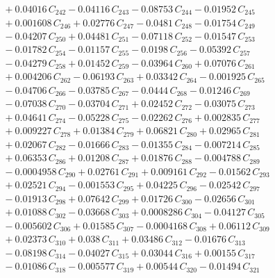 \documentclass[a4paper,11pt]{article}
\begin{document}
\begin{align}
&\quad + 0.04016\,C_{242} - 0.04116\,C_{243} - 0.08753\,C_{244} - 0.01952\,C_{245} \nonumber\\
&\quad + 0.001608\,C_{246} + 0.02776\,C_{247} - 0.0481\,C_{248} - 0.01754\,C_{249} \nonumber\\
&\quad - 0.04207\,C_{250} + 0.04481\,C_{251} - 0.07118\,C_{252} - 0.01547\,C_{253} \nonumber\\
&\quad - 0.01782\,C_{254} - 0.01157\,C_{255} - 0.0198\,C_{256} - 0.05392\,C_{257} \nonumber\\
&\quad - 0.04279\,C_{258} + 0.01452\,C_{259} - 0.03964\,C_{260} + 0.07076\,C_{261} \nonumber\\
&\quad + 0.004206\,C_{262} - 0.06193\,C_{263} + 0.03342\,C_{264} - 0.001925\,C_{265} \nonumber\\
&\quad - 0.04706\,C_{266} - 0.03785\,C_{267} - 0.0444\,C_{268} - 0.01246\,C_{269} \nonumber\\
&\quad - 0.07038\,C_{270} - 0.03704\,C_{271} + 0.02452\,C_{272} - 0.03075\,C_{273} \nonumber\\
&\quad + 0.04641\,C_{274} - 0.05228\,C_{275} - 0.02262\,C_{276} + 0.002835\,C_{277} \nonumber\\
&\quad + 0.009227\,C_{278} + 0.01384\,C_{279} + 0.06821\,C_{280} + 0.02965\,C_{281} \nonumber\\
&\quad + 0.02067\,C_{282} - 0.01666\,C_{283} - 0.01355\,C_{284} - 0.007214\,C_{285} \nonumber\\
&\quad + 0.06353\,C_{286} + 0.01208\,C_{287} + 0.01876\,C_{288} - 0.004788\,C_{289} \nonumber\\
&\quad - 0.0004958\,C_{290} + 0.02761\,C_{291} + 0.009161\,C_{292} - 0.01562\,C_{293} \nonumber\\
&\quad + 0.02521\,C_{294} - 0.001553\,C_{295} + 0.04225\,C_{296} - 0.02542\,C_{297} \nonumber\\
&\quad - 0.01913\,C_{298} + 0.07642\,C_{299} + 0.01726\,C_{300} - 0.02656\,C_{301} \nonumber\\
&\quad + 0.01088\,C_{302} - 0.03668\,C_{303} + 0.0008286\,C_{304} - 0.04127\,C_{305} \nonumber\\
&\quad - 0.005602\,C_{306} + 0.01585\,C_{307} - 0.0004168\,C_{308} + 0.06112\,C_{309} \nonumber\\
&\quad + 0.02373\,C_{310} + 0.038\,C_{311} + 0.03486\,C_{312} - 0.01676\,C_{313} \nonumber\\
&\quad - 0.08198\,C_{314} - 0.04027\,C_{315} + 0.03044\,C_{316} + 0.00155\,C_{317} \nonumber\\
&\quad - 0.01086\,C_{318} - 0.005577\,C_{319} + 0.00544\,C_{320} - 0.01494\,C_{321} \nonumber\\

\end{align}
\end{document}
